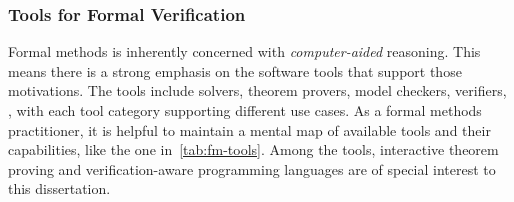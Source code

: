 \subsubsection{Tools for Formal Verification}

Formal methods is inherently concerned with \emph{computer-aided} reasoning.
This means there is a strong emphasis on the software tools that support those motivations.
The tools include solvers, theorem provers, model checkers, verifiers, \etc, with each tool category supporting different use cases.
As a formal methods practitioner, it is helpful to maintain a mental map of available tools and their capabilities, like the one in~\autoref{tab:fm-tools}.
Among the tools, interactive theorem proving and verification-aware programming languages are of special interest to this dissertation.

